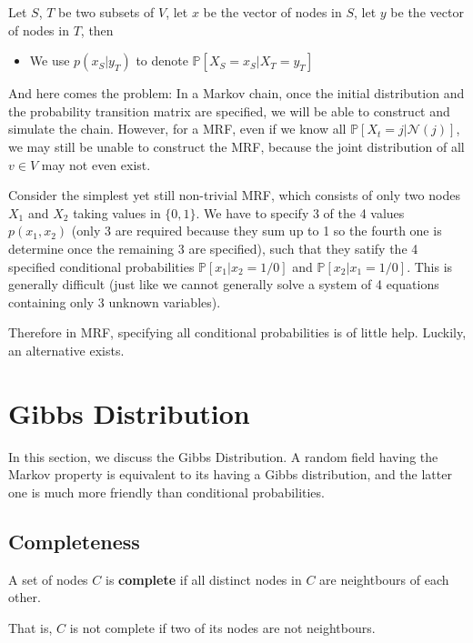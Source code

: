         Let $S$, $T$ be two subsets of $V$, let $x$ be the vector of nodes in $S$, let $y$ be the vector of nodes in $T$, then
        \begin{itemize}
            \item We use $p(x_S|y_T)$ to denote $\mathbb{P}[X_S=x_S|X_T=y_T]$
        \end{itemize}

        And here comes the problem: In a Markov chain, once the initial distribution and the probability transition matrix are specified, we will be able to construct and simulate the chain. However, for a MRF, even if we know all $\mathbb{P}[X_t=j|\mathcal{N}(j)]$, we may still be unable to construct the MRF, because the joint distribution of all $v \in V$ may not even exist.

        Consider the simplest yet still non-trivial MRF, which consists of only two nodes $X_1$ and $X_2$ taking values in $\{0,1\}$. We have to specify 3 of the 4 values $p(x_1, x_2)$ (only 3 are required because they sum up to 1 so the fourth one is determine once the remaining 3 are specified), such that they satify the 4 specified conditional probabilities $\mathbb{P}[x_1|x_2=1/0]$ and $\mathbb{P}[x_2|x_1=1/0]$. This is generally difficult (just like we cannot generally solve a system of 4 equations containing only 3 unknown variables).

        Therefore in MRF, specifying all conditional probabilities is of little help. Luckily, an alternative exists.


\section{Gibbs Distribution}
    In this section, we discuss the Gibbs Distribution. A random field having the Markov property is equivalent to its having a Gibbs distribution, and the latter one is much more friendly than conditional probabilities.

    \subsection{Completeness}
        \begin{definition}\label{def:CompleteGraph}
            A set of nodes $C$ is \textbf{complete} if all distinct nodes in $C$ are neightbours of each other.
        \end{definition}
        \begin{remark}
            That is, $C$ is not complete if two of its nodes are not neightbours.
        \end{remark}

